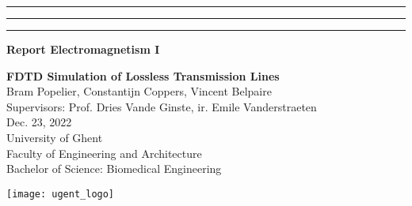 {\color{ugent_blue} \hrule\hrule\hrule}

\vspace*{-0.43mm}
\colorbox{ugent_blue}{\color{white} \bf Report Electromagnetism I}\\

\noindent\begin{minipage}{0.7\textwidth}%
{\LARGE \bf \color{ugent_blue} FDTD Simulation of Lossless Transmission Lines}\\[2mm]

%
{\large Bram Popelier, Constantijn Coppers, Vincent Belpaire}\\
{Supervisors: Prof. Dries Vande Ginste, ir. Emile Vanderstraeten}\\
Dec. 23, 2022\\


{\small University of Ghent}\\
{\small Faculty of Engineering and Architecture}\\
{\small Bachelor of Science: Biomedical Engineering}\\
\end{minipage}%
\hfill%
\begin{minipage}{0.3\textwidth}
\vspace{-2.2cm}
\begin{center}
\texttt{[image: ugent\_logo]}
\end{center}
\end{minipage}\\